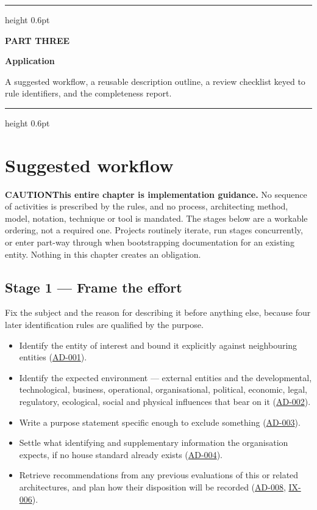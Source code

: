 \documentclass[11pt,a4paper]{report}
\newcommand{\calloutlead}[2]{{\sffamily\bfseries\footnotesize\color{#1}#2\quad}}
\newcommand{\risknote}[1]{\begin{riskbox}\calloutlead{brick}{CAUTION}#1\end{riskbox}}
\newcommand{\rref}[1]{\hyperref[rule:#1]{\textsf{\small #1}}}
\begin{document}
\clearpage
\thispagestyle{empty}
\vspace*{60mm}
{\color{rulegrey}\hrule height 0.6pt}
\vspace{6mm}
{\sffamily\footnotesize\bfseries\color{steel}\MakeUppercase{Part Three}\par}
\vspace{2mm}
{\sffamily\bfseries\fontsize{22}{26}\selectfont\color{navy}Application\par}
\vspace{5mm}
{\sffamily\small\color{slate}A suggested workflow, a reusable description outline, a review checklist keyed to rule identifiers, and the completeness report.\par}
\vspace{6mm}
{\color{rulegrey}\hrule height 0.6pt}
\clearpage

\chapter{Suggested workflow}

\risknote{\textbf{This entire chapter is implementation guidance.} No sequence
of activities is prescribed by the rules, and no process, architecting method,
model, notation, technique or tool is mandated. The stages below are a workable
ordering, not a required one. Projects routinely iterate, run stages
concurrently, or enter part-way through when bootstrapping documentation for an
existing entity. Nothing in this chapter creates an obligation.}

\section{Stage 1 --- Frame the effort}

Fix the subject and the reason for describing it before anything else, because
four later identification rules are qualified by the purpose.

\begin{itemize}
  \item Identify the entity of interest and bound it explicitly against
        neighbouring entities (\rref{AD-001}).
  \item Identify the expected environment --- external entities and the
        developmental, technological, business, operational, organisational,
        political, economic, legal, regulatory, ecological, social and physical
        influences that bear on it (\rref{AD-002}).
  \item Write a purpose statement specific enough to exclude something
        (\rref{AD-003}).
  \item Settle what identifying and supplementary information the organisation
        expects, if no house standard already exists
        (\rref{AD-004}).
  \item Retrieve recommendations from any previous evaluations of this or
        related architectures, and plan how their disposition will be recorded
        (\rref{AD-008}, \rref{IX-006}).
\end{itemize}
\end{document}
